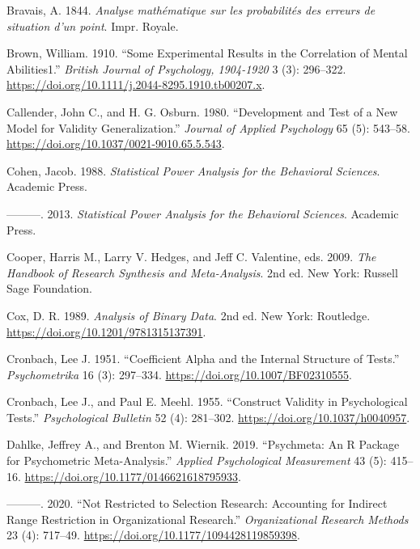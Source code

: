 \documentclass[
  letterpaper,
  DIV=11,
  numbers=noendperiod]{scrreprt}
\newlength{\cslhangindent}
\newenvironment{CSLReferences}[2] %
 {\begin{list}{}{%
  \setlength{\itemindent}{0pt}
  \setlength{\leftmargin}{0pt}
  \setlength{\parsep}{0pt}
  \ifodd #1
   \setlength{\leftmargin}{\cslhangindent}
   \setlength{\itemindent}{-1\cslhangindent}
  \fi
  \setlength{\itemsep}{#2\baselineskip}}}
 {\end{list}}
\begin{document}
\begin{CSLReferences}{1}{0}
Bravais, A. 1844. \emph{Analyse mathématique sur les probabilités des
erreurs de situation d'un point}. Impr. Royale.

Brown, William. 1910. {``Some Experimental Results in the Correlation of
Mental Abilities1.''} \emph{British Journal of Psychology, 1904-1920} 3
(3): 296--322. \url{https://doi.org/10.1111/j.2044-8295.1910.tb00207.x}.

Callender, John C., and H. G. Osburn. 1980. {``Development and Test of a
New Model for Validity Generalization.''} \emph{Journal of Applied
Psychology} 65 (5): 543--58.
\url{https://doi.org/10.1037/0021-9010.65.5.543}.

Cohen, Jacob. 1988. \emph{Statistical Power Analysis for the Behavioral
Sciences}. Academic Press.

---------. 2013. \emph{Statistical Power Analysis for the Behavioral
Sciences}. Academic Press.

Cooper, Harris M., Larry V. Hedges, and Jeff C. Valentine, eds. 2009.
\emph{The Handbook of Research Synthesis and Meta-Analysis}. 2nd ed. New
York: Russell Sage Foundation.

Cox, D. R. 1989. \emph{Analysis of Binary Data}. 2nd ed. New York:
Routledge. \url{https://doi.org/10.1201/9781315137391}.

Cronbach, Lee J. 1951. {``Coefficient Alpha and the Internal Structure
of Tests.''} \emph{Psychometrika} 16 (3): 297--334.
\url{https://doi.org/10.1007/BF02310555}.

Cronbach, Lee J., and Paul E. Meehl. 1955. {``Construct Validity in
Psychological Tests.''} \emph{Psychological Bulletin} 52 (4): 281--302.
\url{https://doi.org/10.1037/h0040957}.

Dahlke, Jeffrey A., and Brenton M. Wiernik. 2019. {``Psychmeta: An R
Package for Psychometric Meta-Analysis.''} \emph{Applied Psychological
Measurement} 43 (5): 415--16.
\url{https://doi.org/10.1177/0146621618795933}.

---------. 2020. {``Not Restricted to Selection Research: Accounting for
Indirect Range Restriction in Organizational Research.''}
\emph{Organizational Research Methods} 23 (4): 717--49.
\url{https://doi.org/10.1177/1094428119859398}.


\end{CSLReferences}
\end{document}
